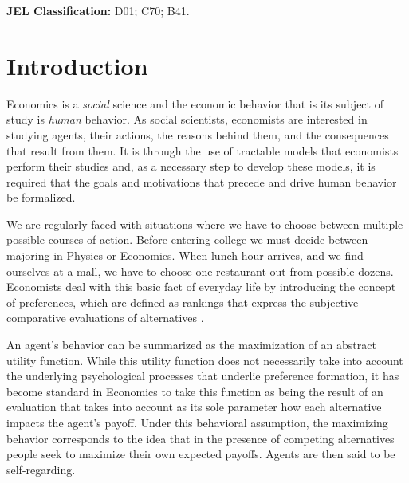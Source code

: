 \documentclass[12pt]{article}
\begin{document}
\noindent
\textbf{JEL Classification:} D01; C70; B41.
	
\newpage

\renewcommand{\contentsname}{Table of Contents}
\begin{center}
\tableofcontents
\end{center}


\newpage

\setcounter{page}{1} %
\section{Introduction}
Economics is a \textit{social} science and the economic behavior that is its subject of study is \textit{human} behavior. As social scientists, economists are interested in studying agents, their actions, the reasons behind them, and the consequences that result from them. It is through the use of tractable models that economists perform their studies and, as a necessary step to develop these models, it is required that the goals and motivations that precede and drive human behavior be formalized. 

We are regularly faced with situations where we have to choose between multiple possible courses of action. Before entering college we must decide between majoring in Physics or Economics. When lunch hour arrives, and we find ourselves at a mall, we have to choose one restaurant out from possible dozens. Economists deal with this basic fact of everyday life by introducing the concept of preferences, which are defined as rankings that express the subjective comparative evaluations of alternatives \citep{hausman2011preference}. 

An agent's behavior can be summarized as the maximization of an abstract utility function. While this utility function does not necessarily take into account the underlying psychological processes that underlie preference formation, it has become standard in Economics to take this function as being the result of an evaluation that takes into account as its sole parameter how each alternative impacts the agent's payoff. Under this behavioral assumption, the maximizing behavior corresponds to the idea that in the presence of competing alternatives people seek to maximize their own expected payoffs. Agents are then said to be self-regarding.
\end{document}

